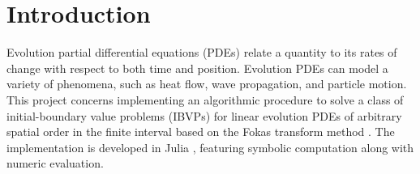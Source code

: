 \documentclass[12pt, oneside, a4paper]{article}
\begin{document}




\tableofcontents
\pagebreak
{}

\pagebreak
{}

\section{Introduction}\label{sec:intro}
Evolution partial differential equations (PDEs) relate a quantity to its rates of change with respect to both time and position. Evolution PDEs can model a variety of phenomena, such as heat flow, wave propagation, and particle motion. This project concerns implementing an algorithmic procedure to solve a class of initial-boundary value problems (IBVPs) for linear evolution PDEs of arbitrary spatial order in the finite interval \cite{Smith2016} based on the Fokas transform method \cite{Fokas2000}\cite{Fokas2001}\cite{Fokas2008}\cite{Smith2012}\cite{Deconinck2014}\cite{Fokas2015}. The implementation is developed in Julia \cite{julia}, featuring symbolic computation along with numeric evaluation.
\end{document}
